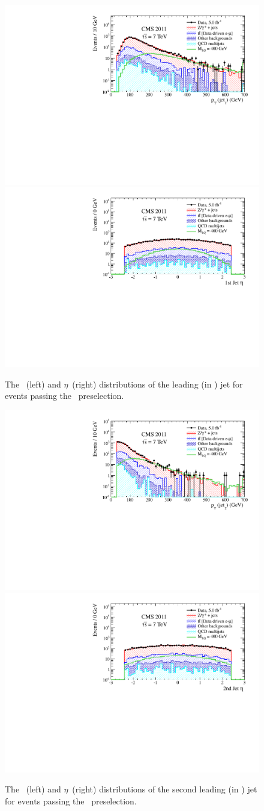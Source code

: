 \begin{figure}
  \begin{center}
    {\includegraphics[width=.49\textwidth]{tex/analysis/event_selection/fig/ee/preselection/Pt1stJet_PAS_eejj_WZSherpa_noNSigma.pdf}}
    {\includegraphics[width=.49\textwidth]{tex/analysis/event_selection/fig/ee/preselection/Eta1stJet_PAS_eejj_WZSherpa_noNSigma.pdf}}
    \caption{
      The \pt~(left) and $\eta$~(right) distributions of the leading
      (in \pt) jet for events passing the \eejj~preselection.
    }
    \label{fig:eejj_preselection_jet1}
  \end{center}
\end{figure}

\begin{figure}
  \begin{center}
    {\includegraphics[width=.49\textwidth]{tex/analysis/event_selection/fig/ee/preselection/Pt2ndJet_PAS_eejj_WZSherpa_noNSigma.pdf}}
    {\includegraphics[width=.49\textwidth]{tex/analysis/event_selection/fig/ee/preselection/Eta2ndJet_PAS_eejj_WZSherpa_noNSigma.pdf}}
    \caption{
      The \pt~(left) and $\eta$~(right) distributions of the second leading
      (in \pt) jet for events passing the \eejj~preselection.
    }
    \label{fig:eejj_preselection_jet2}
  \end{center}
\end{figure}

